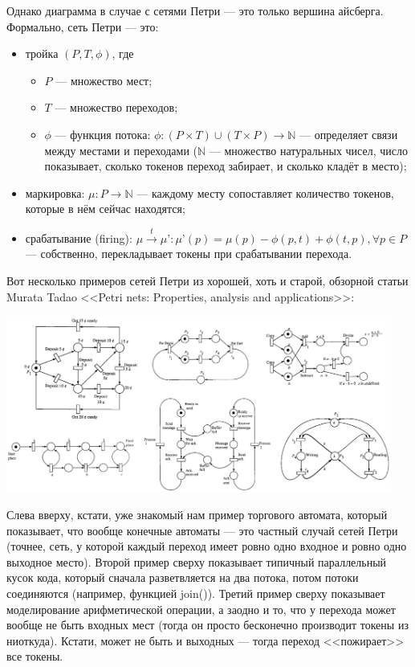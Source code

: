 \documentclass{../mcstext}
\begin{document}
Однако диаграмма в случае с сетями Петри --- это только вершина айсберга. Формально, сеть Петри --- это:

\begin{itemize}
    \item тройка $(P, T, \phi)$, где
    \begin{itemize}
        \item $P$ --- множество мест;
        \item $T$ --- множество переходов;
        \item $\phi$ --- функция потока: $\phi : (P \times T) \cup (T \times P) \rightarrow \mathbb{N}$ --- определяет связи между местами и переходами ($\mathbb{N}$ --- множество натуральных чисел, число показывает, сколько токенов переход забирает, и сколько кладёт в место);
    \end{itemize}
    \item маркировка: $\mu : P \rightarrow \mathbb{N}$ --- каждому месту сопоставляет количество токенов, которые в нём сейчас находятся;
    \item срабатывание (firing):
    $\mu \xrightarrow{t} \mu’ : \mu’(p) = \mu(p) - \phi(p, t) + \phi(t, p), \forall p \in P$ --- собственно, перекладывает токены при срабатывании перехода.
\end{itemize}

Вот несколько примеров сетей Петри из хорошей, хоть и старой, обзорной статьи Murata Tadao <<Petri nets: Properties, analysis and applications>>:

\begin{center}
    \includegraphics[width=0.95\textwidth]{petriNetExamples.png}
\end{center}

Слева вверху, кстати, уже знакомый нам пример торгового автомата, который показывает, что вообще конечные автоматы --- это частный случай сетей Петри (точнее, сеть, у которой каждый переход имеет ровно одно входное и ровно одно выходное место). Второй пример сверху показывает типичный параллельный кусок кода, который сначала разветвляется на два потока, потом потоки соединяются (например, функцией join()). Третий пример сверху показывает моделирование арифметической операции, а заодно и то, что у перехода может вообще не быть входных мест (тогда он просто бесконечно производит токены из ниоткуда). Кстати, может не быть и выходных --- тогда переход <<пожирает>> все токены.
\end{document}
